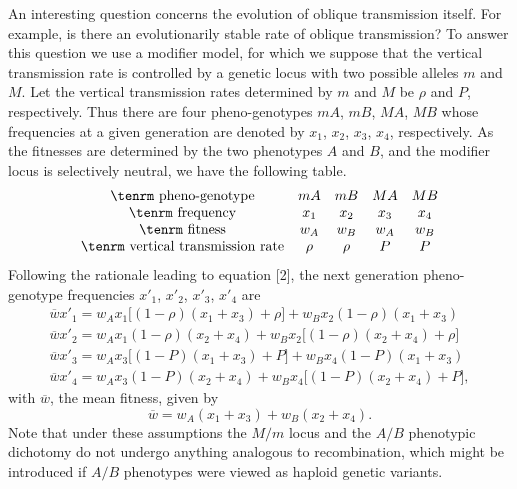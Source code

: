 \documentclass[9pt,twocolumn,twoside,lineno]{pnas-new}
\begin{document}
An interesting question concerns the evolution of oblique transmission itself. For example, is there an evolutionarily stable rate of oblique transmission? To answer this question we use a modifier model, for which we suppose that the vertical transmission rate is controlled by a genetic locus with two possible alleles $m$ and $M$. Let the vertical transmission rates determined by $m$ and $M$ be $\rho$ and $P$, respectively. Thus there are four pheno-genotypes $mA$, $mB$, $MA$, $MB$ whose frequencies at a given generation are denoted by $x_1$, $x_2$, $x_3$, $x_4$, respectively. As the fitnesses are determined by the two phenotypes $A$ and $B$, and the modifier locus is selectively neutral, we have the following table.
 \begin{equation}
 \begin{array}{ccccc}
 \hbox{\tenrm pheno-genotype}&mA&mB&MA&MB\\
 \hbox{\tenrm frequency}&x_1&x_2&x_3&x_4\\
 \hbox{\tenrm fitness}&w_A&w_B&w_A&w_B\\
 \hbox{\tenrm vertical transmission rate}&\rho&\rho&P&P
 \end{array}\label{31}\end{equation}
Following the rationale leading to equation [2], the next generation pheno-genotype frequencies $x'_1$, $x'_2$, $x'_3$, $x'_4$ are
\begin{equation}
\begin{array}{l}
\overline wx'_1 = w_Ax_1\bigl[(1-\rho)(x_1+x_3) +\rho\bigr] +w_Bx_2(1-\rho)(x_1+x_3)\\
 \overline wx'_2 = w_Ax_1(1-\rho)(x_2+x_4) +w_Bx_2\bigl[(1-\rho)(x_2+x_4)+\rho\bigr]\\ 
  \overline wx'_3 = w_Ax_3\bigl[(1-P)(x_1+x_3) +P\bigr] +w_Bx_4(1-P)(x_1+x_3)\\
\overline wx'_4 = w_Ax_3(1-P)(x_2+x_4) +w_Bx_4\bigl[(1-P)(x_2+x_4)+P\bigr], 
\end{array}\label{32}\end{equation}
with $\overline w$, the mean fitness, given by
\begin{equation}
\overline w =w_A(x_1+x_3) +w_B(x_2+x_4).
\label{33}\end{equation}
Note that under these assumptions the $M/m$ locus and the $A/B$ phenotypic dichotomy do not undergo anything analogous to recombination, which might be introduced if $A/B$ phenotypes were viewed as haploid genetic variants. 
\end{document}
